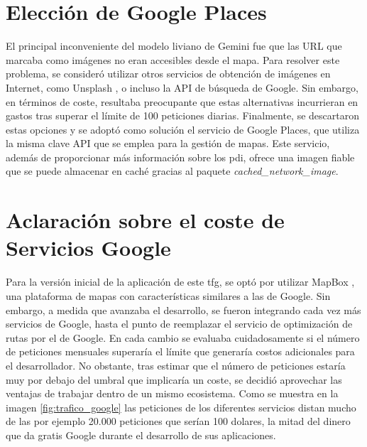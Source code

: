 \section{Elección de Google Places}
El principal inconveniente del modelo liviano de Gemini \cite{deepmindgemini} fue que las URL que marcaba como imágenes no eran accesibles desde el mapa. Para resolver este problema, se consideró utilizar otros servicios de obtención de imágenes en Internet, como Unsplash \cite{unsplash}, o incluso la API de búsqueda de Google. Sin embargo, en términos de coste, resultaba preocupante que estas alternativas incurrieran en gastos tras superar el límite de 100 peticiones diarias. Finalmente, se descartaron estas opciones y se adoptó como solución el servicio de Google Places, que utiliza la misma clave API que se emplea para la gestión de mapas. Este servicio, además de proporcionar más información sobre los \acrlong{pdi}, ofrece una imagen fiable que se puede almacenar en caché gracias al paquete \textit{cached\_network\_image}.

\section{Aclaración sobre el coste de Servicios Google}
Para la versión inicial de la aplicación de este \acrshort{tfg}, se optó por utilizar MapBox \cite{mapbox}, una plataforma de mapas con características similares a las de Google. Sin embargo, a medida que avanzaba el desarrollo, se fueron integrando cada vez más servicios de Google, hasta el punto de reemplazar el servicio de optimización de rutas por el de Google. En cada cambio se evaluaba cuidadosamente si el número de peticiones mensuales superaría el límite que generaría costos adicionales para el desarrollador. No obstante, tras estimar que el número de peticiones estaría muy por debajo del umbral que implicaría un coste, se decidió aprovechar las ventajas de trabajar dentro de un mismo ecosistema. Como se muestra en la imagen \ref{fig:trafico_google} las peticiones de los diferentes servicios distan mucho de las por ejemplo 20.000 peticiones que serían 100 dolares, la mitad del dinero que da gratis Google durante el desarrollo de sus aplicaciones.
